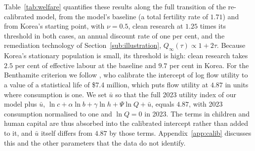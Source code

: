 \documentclass[11pt]{article}
\begin{document}
Table~\ref{tab:welfare} quantifies these results along the full transition of the re-calibrated model,
from the model's baseline (a total fertility rate of $1.71$) and from Korea's starting point, with
$\nu=0.5$, clean research at $1.25$ times its threshold in both cases, an annual discount rate of one per
cent, and the remediation technology of Section~\ref{sub:illustration}, $Q_\infty(\tau)\propto1+2\tau$.
Because Korea's stationary population is small, its threshold is high: clean research takes $2.5$ per cent
of effective labour at the baseline and $9.7$ per cent in Korea. For the Benthamite criterion we follow \citet{adhami2024}, who calibrate the intercept of log flow
utility to a value of a statistical life of \$7.4 million, which puts flow utility at $4.87$ in units
where consumption is one. We set $\bar u$ so that the full 2023 utility index of our model plus
$\bar u$, $\ln c+\alpha\ln b+\gamma\ln h+\Psi\ln Q+\bar u$, equals $4.87$, with 2023 consumption
normalised to one and $\ln Q=0$ in 2023. The terms in children and human capital are thus absorbed into
the calibrated intercept rather than added to it, and $\bar u$ itself differs from $4.87$ by those terms. Appendix~\ref{app:calib} discusses this and the
other parameters that the data do not identify.
\end{document}
